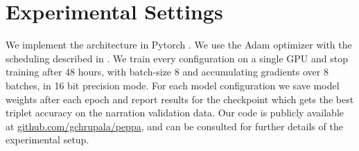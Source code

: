 \section{Experimental Settings}
We implement the architecture in Pytorch \citep{NEURIPS2019_9015}. We
use the Adam optimizer \citep{kingma2014adam} with the scheduling
described in \citep{devlin-etal-2019-bert}. We train every
configuration on a single GPU and stop training after 48 hours, with
batch-size 8 and accumulating gradients over 8 batches, in 16 bit
precision mode. For each model configuration we save model weights
after each epoch and report results for the checkpoint which gets the
best triplet accuracy on the narration validation data.
Our code is publicly available at \url{github.com/gchrupala/peppa},
and can be consulted for further details of the experimental setup.
